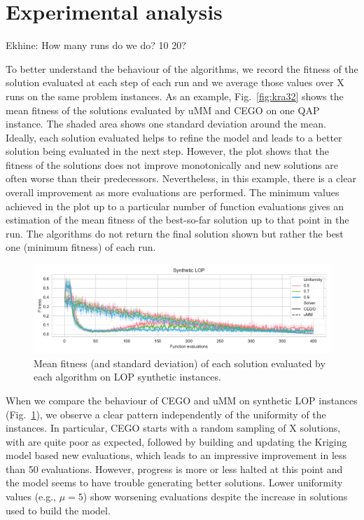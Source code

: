 \documentclass[runningheads]{llncs}
\begin{document}
\section{Experimental analysis}

Ekhine: How many runs do we do? 10 20?

To better understand the behaviour of the algorithms, we record the fitness of
the solution evaluated at each step of each run and we average those values
over X runs on the same problem instances.  As an example, Fig.~\ref{fig:kra32}
shows the mean fitness of the solutions evaluated by uMM and CEGO on one QAP
instance. The shaded area shows one standard deviation around the
mean. Ideally, each solution evaluated helps to refine the model and leads to a
better solution being evaluated in the next step.  However, the plot shows that
the fitness of the solutions does not improve monotonically and new solutions
are often worse than their predecessors. Nevertheless, in this example, there
is a clear overall improvement as more evaluations are performed. The minimum
values achieved in the plot up to a particular number of function evaluations
gives an estimation of the mean fitness of the best-so-far solution up to that
point in the run. The algorithms do not return the final solution shown but
rather the best one (minimum fitness) of each run.


\begin{figure}
  \centering%
  \includegraphics[width=\textwidth]{img/synthetic_LOP_combined}
  \caption{Mean fitness  (and standard deviation)  of each solution evaluated by each algorithm on LOP synthetic instances.\label{fig:lop_synth}}
\end{figure}

When we compare the behaviour of CEGO and uMM on synthetic LOP instances
(Fig.~\ref{fig:lop_synth}), we observe a clear pattern independently of the
uniformity of the instances. In particular, CEGO starts with a random sampling
of X solutions, with are quite poor as expected, followed by building and
updating the Kriging model based new evaluations, which leads to an impressive
improvement in less than 50 evaluations. However, progress is more or less
halted at this point and the model seems to have trouble generating better
solutions. Lower uniformity values (e.g., $\mu=5$) show worsening evaluations
despite the increase in solutions used to build the model.
\end{document}
